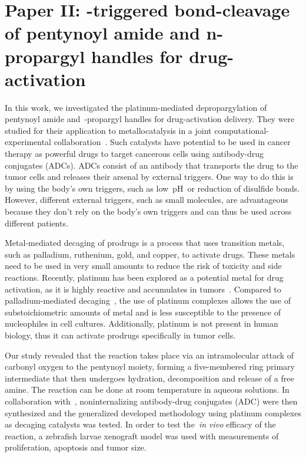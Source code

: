 \chapter{Paper II:\@
  -triggered bond-cleavage of pentynoyl amide
  and n-propargyl handles for drug-activation
 }%
\label{ch:paper2}

\begin{citacao}
\end{citacao}

In this work,
we investigated the platinum-mediated depropargylation of pentynoyl amide
and~-propargyl handles for drug-activation delivery.
They were studied for their application to metallocatalysis in a joint computational-experimental collaboration~\cite{Oliveira_2020}.
Such catalysts have potential to be used in cancer therapy as powerful drugs to target cancerous cells using antibody-drug conjugates (ADCs).
ADCs consist of an antibody that transports the drug to the tumor cells
and releases their arsenal by external triggers.
One way to do this is by using the body's own triggers,
such as low~pH~or reduction of disulfide bonds.
However,
different external triggers,
such as small molecules,
are advantageous because they don't rely on the body's own triggers and can thus be used across different patients.

Metal-mediated decaging of prodrugs is a process that uses transition metals,
such as palladium,
ruthenium,
gold,
and copper,
to activate drugs.
These metals need to be used in very small amounts to reduce the risk of toxicity and side reactions.
Recently,
platinum has been explored as a potential metal for drug activation,
as it is highly reactive and accumulates in tumors~\cite{Miller_2017,Oliveira_2020}.
Compared to palladium-mediated decaging~\cite{Coelho_2019},
the use of platinum complexes allows the use of substoichiometric amounts of metal
and is less susceptible to the presence of nucleophiles in cell cultures.
Additionally,
platinum is not present in human biology,
thus it can activate prodrugs specifically in tumor cells.

Our study revealed that the reaction takes place via an intramolecular
attack of carbonyl oxygen to the pentynoyl moiety,
forming a five-membered ring primary intermediate that then undergoes hydration,
decomposition and release of a free amine.
The reaction can be done at room temperature in aqueous solutions.
In collaboration with~\citeauthor{Oliveira_2020},
noninternalizing antibody-drug conjugates (ADC)
were then synthesized
and the generalized developed methodology using platinum complexes as decaging catalysts
was tested.
In order to test the~\emph{in vivo} efficacy of the reaction,
a zebrafish larvae xenograft model was used with measurements of proliferation,
apoptosis and tumor size.

